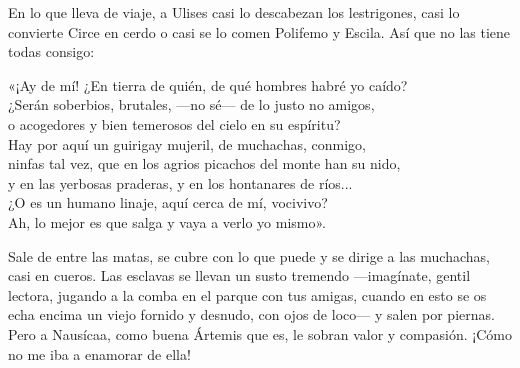 En lo que lleva de viaje, a Ulises casi lo descabezan los lestrigones, casi lo convierte Circe en cerdo o casi se lo comen Polifemo y Escila. Así que no las tiene todas consigo:

\begin{versocita}
«¡Ay de mí! ¿En tierra de quién, de qué hombres habré yo caído?\\
¿Serán soberbios, brutales, ---no sé--- de lo justo no amigos,\\
o acogedores y bien temerosos del cielo en su espíritu?\\
Hay por aquí un guirigay mujeril, de muchachas, conmigo,\\
ninfas tal vez, que en los agrios picachos del monte han su nido,\\
y en las yerbosas praderas, y en los hontanares de ríos...\\
¿O es un humano linaje, aquí cerca de mí, vocivivo?\\
Ah, lo mejor es que salga y vaya a verlo yo mismo».
\end{versocita}

Sale de entre las matas, se cubre con lo que puede y se dirige a las muchachas, casi en cueros. Las esclavas se llevan un susto tremendo ---imagínate, gentil lectora, jugando a la comba en el parque con tus amigas, cuando en esto se os echa encima un viejo fornido y desnudo, con ojos de loco--- y salen por piernas. Pero a Nausícaa, como buena Ártemis que es, le sobran valor y compasión. ¡Cómo no me iba a enamorar de ella!

